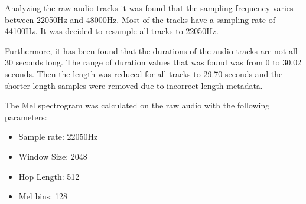 Analyzing the raw audio tracks it was found that the sampling frequency varies between 22050Hz and 48000Hz. 
Most of the tracks have a sampling rate of 44100Hz.
It was decided to resample all tracks to 22050Hz.

Furthermore, it has been found that the durations of the audio tracks are not all 30 seconds long.
The range of duration values that was found was from 0 to 30.02 seconds.
Then the length was reduced for all tracks to 29.70 seconds and the shorter length samples were removed due to incorrect length metadata.


The Mel spectrogram was calculated on the raw audio with the following parameters: 
\begin{itemize}
  \item Sample rate: 22050Hz
  \item Window Size: 2048
  \item Hop Length: 512
  \item Mel bins: 128
\end{itemize}

